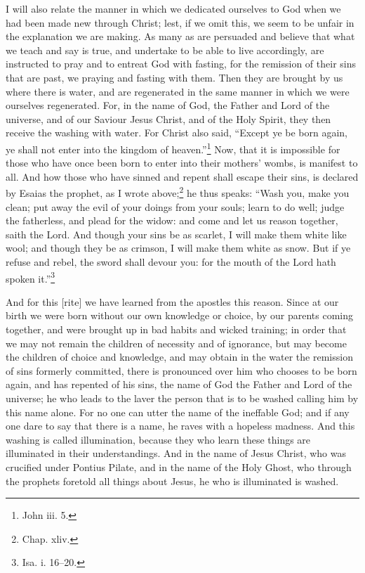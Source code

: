 
I will also relate the manner in which we dedicated ourselves to God when we had been made new through Christ; lest, if we omit this, we seem to be unfair in the explanation we are making. As many as are persuaded and believe that what we teach and say is true, and undertake to be able to live accordingly, are instructed to pray and to entreat God with fasting, for the remission of their sins that are past, we praying and fasting with them. Then they are brought by us where there is water, and are regenerated in the same manner in which we were ourselves regenerated. For, in the name of God, the Father and Lord of the universe, and of our Saviour Jesus Christ, and of the Holy Spirit, they then receive the washing with water. For Christ also said, “Except ye be born again, ye shall not enter into the kingdom of heaven.”\footnote{John iii. 5.} Now, that it is impossible for those who have once been born to enter into their mothers’ wombs, is manifest to all. And how those who have sinned and repent shall escape their sins, is declared by Esaias the prophet, as I wrote above;\footnote{Chap. xliv.} he thus speaks: “Wash you, make you clean; put away the evil of your doings from your souls; learn to do well; judge the fatherless, and plead for the widow: and come and let us reason together, saith the Lord. And though your sins be as scarlet, I will make them white like wool; and though they be as crimson, I will make them white as snow. But if ye refuse and rebel, the sword shall devour you: for the mouth of the Lord hath spoken it.”\footnote{Isa. i. 16–20.}

And for this [rite] we have learned from the apostles this reason. Since at our birth we were born without our own knowledge or choice, by our parents coming together, and were brought up in bad habits and wicked training; in order that we may not remain the children of necessity and of ignorance, but may become the children of choice and knowledge, and may obtain in the water the remission of sins formerly committed, there is pronounced over him who chooses to be born again, and has repented of his sins, the name of God the Father and Lord of the universe; he who leads to the laver the person that is to be washed calling him by this name alone. For no one can utter the name of the ineffable God; and if any one dare to say that there is a name, he raves with a hopeless madness. And this washing is called illumination, because they who learn these things are illuminated in their understandings. And in the name of Jesus Christ, who was crucified under Pontius Pilate, and in the name of the Holy Ghost, who through the prophets foretold all things about Jesus, he who is illuminated is washed.

